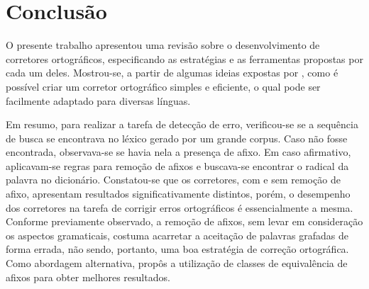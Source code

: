 \documentclass{textolivre}
\begin{document}



\section{Conclusão}
O presente trabalho apresentou uma revisão sobre o desenvolvimento de corretores ortográficos, especificando
as estratégias e as ferramentas
propostas por cada um deles.
Mostrou-se, a partir de algumas
ideias expostas por \textcite{norvig2007,robbins2005}, 
como é possível
criar um corretor ortográfico simples e eficiente, o qual pode ser facilmente
adaptado para diversas línguas. 

Em resumo, para realizar a tarefa de detecção de erro, verificou-se se a sequência de busca se
encontrava no léxico gerado por um
grande corpus. Caso não fosse encontrada, observava-se se havia
nela a presença de afixo. Em caso afirmativo, aplicavam-se regras para
remoção de afixos e buscava-se
encontrar o radical da palavra no
dicionário. Constatou-se que os corretores, com
e sem remoção de afixo, apresentam resultados
significativamente distintos, porém, 
o desempenho dos corretores na tarefa de corrigir
erros ortográficos é essencialmente a mesma. 
Conforme previamente observado,
a remoção de afixos, sem levar em consideração os aspectos gramaticais,
costuma acarretar a aceitação
de palavras grafadas de
forma errada, não 
sendo, portanto, uma boa estratégia de
correção ortográfica.
Como abordagem alternativa,
\textcite{elliott1988} propôs a utilização de classes
de equivalência
de afixos para obter melhores resultados.
\end{document}
